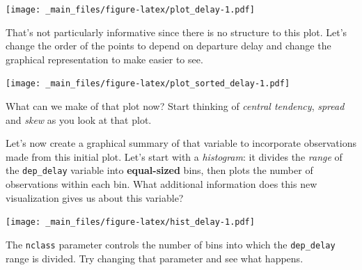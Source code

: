 \documentclass[]{article}
\newenvironment{Shaded}{\begin{snugshade}}{\end{snugshade}}
\newcommand{\KeywordTok}[1]{\textcolor[rgb]{0.13,0.29,0.53}{\textbf{{#1}}}}
\newcommand{\DataTypeTok}[1]{\textcolor[rgb]{0.13,0.29,0.53}{{#1}}}
\newcommand{\StringTok}[1]{\textcolor[rgb]{0.31,0.60,0.02}{{#1}}}
\newcommand{\NormalTok}[1]{{#1}}
\theoremstyle{definition}
\theoremstyle{definition}
\theoremstyle{remark}
\begin{document}
\begin{Shaded}
\end{Shaded}

\texttt{[image: \_main\_files/figure-latex/plot\_delay-1.pdf]}

That's not particularly informative since there is no structure to this
plot. Let's change the order of the points to depend on departure delay
and change the graphical representation to make easier to see.

\begin{Shaded}
\end{Shaded}

\texttt{[image: \_main\_files/figure-latex/plot\_sorted\_delay-1.pdf]}

What can we make of that plot now? Start thinking of \emph{central
tendency}, \emph{spread} and \emph{skew} as you look at that plot.

Let's now create a graphical summary of that variable to incorporate
observations made from this initial plot. Let's start with a
\emph{histogram}: it divides the \emph{range} of the \texttt{dep\_delay}
variable into \textbf{equal-sized} bins, then plots the number of
observations within each bin. What additional information does this new
visualization gives us about this variable?

\begin{Shaded}
\end{Shaded}

\texttt{[image: \_main\_files/figure-latex/hist\_delay-1.pdf]}

The \texttt{nclass} parameter controls the number of bins into which the
\texttt{dep\_delay} range is divided. Try changing that parameter and
see what happens.
\end{document}
